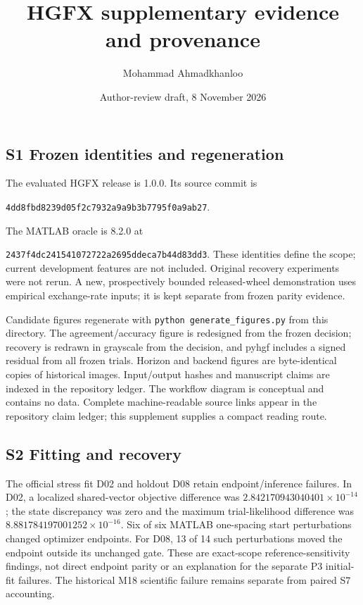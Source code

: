 \documentclass[
  11pt,
]{article}
\title{HGFX supplementary evidence and provenance}
\author{Mohammad Ahmadkhanloo}
\date{Author-review draft, 8 November 2026}
\begin{document}
\maketitle

\subsection{S1 Frozen identities and
regeneration}\label{s1-frozen-identities-and-regeneration}

The evaluated HGFX release is 1.0.0. Its source commit is

\texttt{4dd8fbd8239d05f2c7932a9a9b3b7795f0a9ab27}.

The MATLAB oracle is 8.2.0 at

\texttt{2437f4dc241541072722a2695ddeca7b44d83dd3}. These identities
define the scope; current development features are not included.
Original recovery experiments were not rerun. A new, prospectively
bounded released-wheel demonstration uses empirical exchange-rate
inputs; it is kept separate from frozen parity evidence.

Candidate figures regenerate with \texttt{python\ generate\_figures.py}
from this directory. The agreement/accuracy figure is redesigned from
the frozen decision; recovery is redrawn in grayscale from the decision,
and pyhgf includes a signed residual from all frozen trials. Horizon and
backend figures are byte-identical copies of historical images.
Input/output hashes and manuscript claims are indexed in the repository
ledger. The workflow diagram is conceptual and contains no data.
Complete machine-readable source links appear in the repository claim
ledger; this supplement supplies a compact reading route.

\subsection{S2 Fitting and recovery}\label{s2-fitting-and-recovery}

The official stress fit D02 and holdout D08 retain endpoint/inference
failures. In D02, a localized shared-vector objective difference was
\(2.842170943040401\times10^{-14}\); the state discrepancy was zero and
the maximum trial-likelihood difference was
\(8.881784197001252\times10^{-16}\). Six of six MATLAB one-spacing start
perturbations changed optimizer endpoints. For D08, 13 of 14 such
perturbations moved the endpoint outside its unchanged gate. These are
exact-scope reference-sensitivity findings, not direct endpoint parity
or an explanation for the separate P3 initial-fit failures. The
historical M18 scientific failure remains separate from paired S7
accounting.
\end{document}

